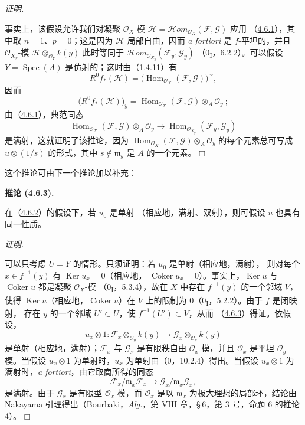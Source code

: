 \documentclass[UTF8,fontset=none,11pt,oneside,openany]{ctexbook}
\providecommand{\square}{\mdlgwhtsquare}
\newenvironment{corollary}[1][]{%
  \par\medskip\noindent\textbf{推论 (#1).}\ %
}{\par}
\newenvironment{proof}{%
  \par\smallskip\noindent\textit{证明.}\ %
}{\hfill$\square$\par}
\let\EGAOriginalLabel\label
\renewcommand{\label}[1]{\phantomsection\EGAOriginalLabel{#1}}
\begin{document}
\begin{proof}
事实上，该假设允许我们对凝聚 $\mathcal O_X$-模
$\mathcal H=\mathcal{H}\!om_{\mathcal O_X}(\mathcal F,\mathcal G)$ 应用
（\hyperref[III.4.6.1-fr]{4.6.1}），其中取 $n=1$、$p=0$；这是因为
$\mathcal H$ 局部自由，因而 \emph{a fortiori} 是 $f$-平坦的，并且
$\mathcal O_{X_y}$-模 $\mathcal H\otimes_{\mathcal O_Y}k(y)$ 此时等同于
$\mathcal{H}\!om_{\mathcal O_{X_y}}(\mathcal F_y,\mathcal G_y)$
（0\textsubscript{I}，6.2.2）。可以假设 $Y=\operatorname{Spec}(A)$
是仿射的；这时由（\hyperref[III.1.4.11-fr]{1.4.11}）有
\[
R^0f_*(\mathcal H)=
\bigl(\operatorname{Hom}_{\mathcal O_X}(\mathcal F,\mathcal G)\bigr)^\sim,
\]
因而
\[
\bigl(R^0f_*(\mathcal H)\bigr)_y
=\operatorname{Hom}_{\mathcal O_X}(\mathcal F,\mathcal G)
\otimes_A\mathcal O_y~;
\]
由（\hyperref[III.4.6.1-fr]{4.6.1}），典范同态
\[
\operatorname{Hom}_{\mathcal O_X}(\mathcal F,\mathcal G)
\otimes_A\mathcal O_y
\longrightarrow
\operatorname{Hom}_{\mathcal O_{X_y}}(\mathcal F_y,\mathcal G_y)
\]
是满射，这就证明了该推论，因为
$\operatorname{Hom}_{\mathcal O_X}(\mathcal F,\mathcal G)
\otimes_A\mathcal O_y$ 的每个元素总可写成 $u\otimes(1/s)$ 的形式，其中
$s\notin\mathfrak m_y$ 是 $A$ 的一个元素。
\end{proof}

这个推论可由下一个推论加以补充：

\begin{corollary}[4.6.3]
\label{III.4.6.3-fr}
在（\hyperref[III.4.6.2-fr]{4.6.2}）的假设下，若 $u_0$ 是单射
（相应地，满射、双射），则可假设 $u$ 也具有同一性质。
\end{corollary}

\begin{proof}
可以只考虑 $U=Y$ 的情形。只须证明：若 $u_0$ 是单射（相应地，满射），
则对每个 $x\in f^{-1}(y)$ 有 $\operatorname{Ker}u_x=0$（相应地，
$\operatorname{Coker}u_x=0$）。事实上，$\operatorname{Ker}u$ 与
$\operatorname{Coker}u$ 都是凝聚 $\mathcal O_X$-模
（0\textsubscript{I}，5.3.4），故在 $X$ 中存在 $f^{-1}(y)$ 的一个邻域
$V$，使得 $\operatorname{Ker}u$（相应地，$\operatorname{Coker}u$）在
$V$ 上的限制为 $0$（0\textsubscript{I}，5.2.2）。由于 $f$ 是闭映射，
存在 $y$ 的一个邻域 $U'\subset U$，使 $f^{-1}(U')\subset V$，从而
（\hyperref[III.4.6.3-fr]{4.6.3}）得证。依假设，
\[
u_x\otimes1:
\mathcal F_x\otimes_{\mathcal O_y}k(y)
\longrightarrow
\mathcal G_x\otimes_{\mathcal O_y}k(y)
\]
是单射（相应地，满射）；$\mathcal F_x$ 与 $\mathcal G_x$ 是有限秩自由
$\mathcal O_x$-模，并且 $\mathcal O_x$ 是平坦 $\mathcal O_y$-模。当假设
$u_x\otimes1$ 为单射时，$u_x$ 为单射由（0，10.2.4）得出。当假设
$u_x\otimes1$ 为满射时，\emph{a fortiori}，由它取商所得的同态
\[
\mathcal F_x/\mathfrak m_x\mathcal F_x
\longrightarrow
\mathcal G_x/\mathfrak m_x\mathcal G_x,
\]
是满射。由于 $\mathcal G_x$ 是有限型 $\mathcal O_x$-模，而
$\mathcal O_x$ 是以 $\mathfrak m_x$ 为极大理想的局部环，结论由 Nakayama
引理得出（Bourbaki，\emph{Alg.}，第 VIII 章，\S\,6，第 3 号，命题 6
的推论 4）。
\end{proof}
\end{document}
